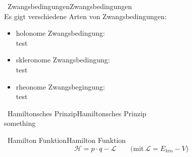 		\begin{proposition}{\currentboxsection \ Zwangsbedingungen}{Zwangsbedingungen} \label{Zwangsbedingungen}  \\
			Es gigt verschiedene Arten von Zwangsbedingungen:
				\begin{itemize}
				\item holonome Zwangsbedingung\label{def:holo_zwang}: \\ test
				\item skleronome Zwangsbedingung\label{def:sklero_zwang}: \\ test
				\item rheonome Zwangsbegingung\label{def:rheo_zwang}: \\ test
			\end{itemize}
		\end{proposition}
		
	 \label{sec:ham_gl} \label{sec:ham_form}
		\begin{proposition}{\currentboxsection \ Hamiltonsches Prinzip}{Hamiltonsches Prinzip} \label{Hamiltonsches-Prinzip}  \\
			something
		\end{proposition}
		
		\begin{proposition}{\currentboxsection \ Hamilton Funktion}{Hamilton Funktion} \label{Hamilton-Funktion} 
			\begin{equation}
				\mathcal{H} = p \cdot q\dot{} - \mathcal{L} \qquad \text{(mit} \  \mathcal{L} = E_{kin} - V \text{)}
			\end{equation}
		\end{proposition}